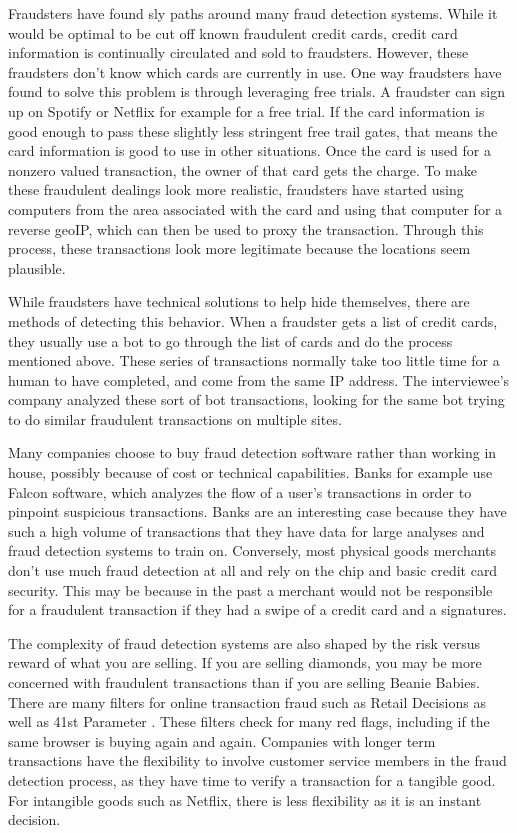 \documentclass[midd]{thesis}
\begin{document}
Fraudsters have found sly paths around many fraud detection systems. While it would be optimal to be cut off known fraudulent credit cards, credit card information is continually circulated and sold to fraudsters. However, these fraudsters don't know which cards are currently in use. One way fraudsters have found to solve this problem is through leveraging free trials. A fraudster can sign up on Spotify or Netflix for example for a free trial. If the card information is good enough to pass these slightly less stringent free trail gates, that means the card information is good to use in other situations. Once the card is used for a nonzero valued transaction, the owner of that card gets the charge. To make these fraudulent dealings look more realistic, fraudsters have started using computers from the area associated with the card and using that computer for a reverse geoIP, which can then be used to proxy the transaction. Through this process, these transactions look more legitimate because the locations seem plausible. 

While fraudsters have technical solutions to help hide themselves, there are methods of detecting this behavior. When a fraudster gets a list of credit cards, they usually use a bot to go through the list of cards and do the process mentioned above. These series of transactions normally take too little time for a human to have completed, and come from the same IP address. The interviewee's company analyzed these sort of bot transactions, looking for the same bot trying to do similar fraudulent transactions on multiple sites. 

Many companies choose to buy fraud detection software rather than working in house, possibly because of cost or technical capabilities. Banks for example use Falcon software, which analyzes the flow of a user's transactions in order to pinpoint suspicious transactions. Banks are an interesting case because they have such a high volume of transactions that they have data for large analyses and fraud detection systems to train on. Conversely, most physical goods merchants don't use much fraud detection at all and rely on the chip and basic credit card security. This may be because in the past a merchant would not be responsible for a fraudulent transaction if they had a swipe of a credit card and a signatures. 

The complexity of fraud detection systems are also shaped by the risk versus reward of what you are selling. If you are selling diamonds, you may be more concerned with fraudulent transactions than if you are selling Beanie Babies. There are many filters for online transaction fraud such as Retail Decisions \cite{Retail} as well as 41st Parameter \cite{41st}. These filters check for many red flags, including if the same browser is buying again and again. Companies with longer term transactions have the flexibility to involve customer service members in the fraud detection process, as they have time to verify a transaction for a tangible good. For intangible goods such as Netflix, there is less flexibility as it is an instant decision. 
\end{document}

